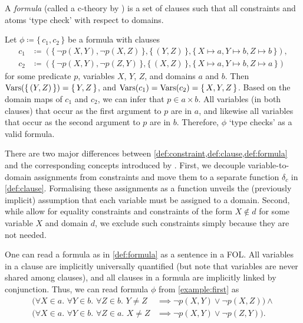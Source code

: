 \begin{definition}[Formula]\label{def:formula}
  A \emph{formula} (called a c-theory by \citet{DBLP:conf/ijcai/BroeckTMDR11})
  is a set of clauses such that all constraints and atoms `type check' with
  respect to domains.
\end{definition}

\begin{example}\label{example:first}
  Let $\phi \coloneqq \{\, c_1, c_2 \,\}$ be a formula with clauses
  \begin{align*}
    c_1 &\coloneqq (\{\, \neg p(X, Y), \neg p(X, Z) \,\}, \{\, (Y, Z) \,\}, \{\, X \mapsto a, Y \mapsto b, Z \mapsto b \,\}),\\
    c_2 &\coloneqq (\{\, \neg p(X, Y), \neg p(Z, Y) \,\}, \{\, (X, Z) \,\}, \{\, X \mapsto a, Y \mapsto b, Z \mapsto a \,\})
  \end{align*}
  for some predicate $p$, variables $X$, $Y$, $Z$, and domains $a$ and $b$. Then
  $\operatorname{Vars}(\{\, (Y, Z) \,\}) = \{\, Y, Z \,\}$, and
  $\operatorname{Vars}(c_{1}) = \operatorname{Vars}(c_{2}) = \{\, X, Y, Z \,\}$. Based on the domain maps of
  $c_{1}$ and $c_{2}$, we can infer that $p \in a \times b$. All variables (in
  both clauses) that occur as the first argument to $p$ are in $a$, and likewise
  all variables that occur as the second argument to $p$ are in $b$. Therefore,
  $\phi$ `type checks' as a valid formula.
\end{example}

There are two major differences between
\cref{def:constraint,def:clause,def:formula} and the corresponding concepts
introduced by \citet{DBLP:conf/ijcai/BroeckTMDR11}. First, we decouple
variable-to-domain assignments from constraints and move them to a separate
function $\delta_{c}$ in \cref{def:clause}. Formalising these assignments as a
function unveils the (previously implicit) assumption that each variable must be
assigned to a domain. Second, while \citet{DBLP:conf/ijcai/BroeckTMDR11} allow
for equality constraints and constraints of the form $X \not\in d$ for some
variable $X$ and domain $d$, we exclude such constraints simply because they are
not needed.

One can read a formula as in \cref{def:formula} as a sentence in a FOL\@.
All variables in a
clause are implicitly universally quantified (but note that variables are never
shared among clauses), and all clauses in a formula are implicitly linked by
conjunction. Thus, we can read formula $\phi$ from \cref{example:first} as
\begin{align*}
  (\forall X \in a\text{. }\forall Y \in b\text{. }\forall Z \in b\text{. }Y \ne Z &\implies \neg p(X, Y) \lor \neg p(X, Z)) \land \\
  (\forall X \in a\text{. }\forall Y \in b\text{. }\forall Z \in a\text{. }X \ne Z &\implies \neg p(X, Y) \lor \neg p(Z, Y)).
\end{align*}

